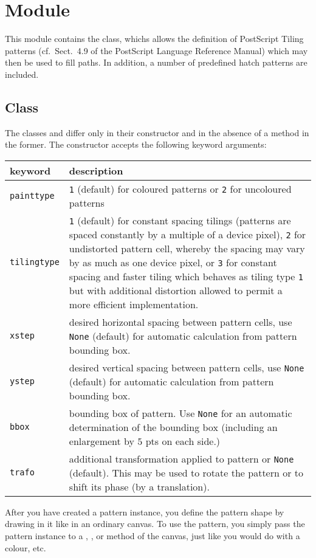 \section{Module }
\label{pattern}


This module contains the  class, whichs allows the definition of PostScript Tiling
patterns (cf.\ Sect.~4.9 of the PostScript Language Reference Manual)
which may then be used to fill paths. In addition, a number of
predefined hatch patterns are included.



\subsection{Class }

The classes  and  differ only in their
constructor and in the absence of a  method in
the former. The  constructor accepts the following
keyword arguments:

\medskip
\begin{tabularx}{\linewidth}{l>{\raggedright\arraybackslash}X}
keyword&description\\
\hline
\texttt{painttype}&\texttt{1} (default) for coloured patterns or
\texttt{2} for uncoloured patterns\\
\texttt{tilingtype}&\texttt{1} (default) for constant spacing tilings
(patterns are spaced constantly by a multiple of a device pixel),
\texttt{2} for undistorted pattern cell, whereby the spacing may vary
by as much as one device pixel, or \texttt{3} for constant spacing and
faster tiling which behaves as tiling type \texttt{1} but with
additional distortion allowed to permit a more efficient
implementation.\\
\texttt{xstep}&desired horizontal spacing between pattern cells, use
\texttt{None} (default) for automatic calculation from pattern
bounding box.\\
\texttt{ystep}&desired vertical spacing between pattern cells, use
\texttt{None} (default) for automatic calculation from pattern
bounding box.\\
\texttt{bbox}&bounding box of pattern. Use \texttt{None} for an
automatic determination of the bounding box (including an
enlargement by $5$ pts on each side.)\\
\texttt{trafo}&additional transformation applied to pattern or
\texttt{None} (default). This may be used to rotate the pattern or to
shift its phase (by a translation).
\end{tabularx}
\medskip

After you have created a pattern instance, you define the pattern
shape by drawing in it like in an ordinary canvas. To use the pattern,
you simply pass the pattern instance to a ,
,  or  method of the
canvas, just like you would do with a colour, etc.



